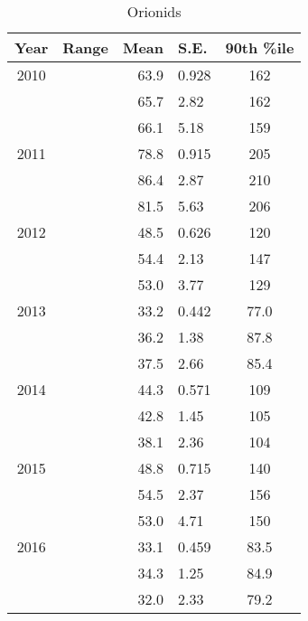 \begin{table}[h!]
	\centering
	\begin{tabular}{|c|c|r@{ \,$\pm$\, }l|c|}
		\hline 
		Year & Range & Mean & S.E. & 90th \%ile\\ 
		\hline 
		2010 & & 63.9 & 0.928 & 162   \\ 
		\hline 
		& &	65.7 & 2.82 & 162   \\ 
		\hline 
		& & 66.1 & 5.18 & 159   \\ 
		\hline 
		2011 & & 78.8 & 0.915 & 205   \\ 
		\hline 
		& & 86.4 & 2.87 & 210   \\ 
		\hline 
		& & 81.5 & 5.63 & 206   \\ 
		\hline 
		2012 & & 48.5 & 0.626 & 120   \\ 
		\hline 
		& & 54.4 & 2.13 & 147   \\ 
		\hline 
		& & 53.0 & 3.77 & 129   \\ 
		\hline 
		2013 & & 33.2 & 0.442 & 77.0   \\ 
		\hline 
		& & 36.2 & 1.38 & 87.8   \\ 
		\hline 
		& & 37.5 & 2.66 & 85.4   \\ 
		\hline 
		2014 & & 44.3 & 0.571 & 109   \\ 
		\hline 
		& & 42.8 & 1.45 & 105   \\ 
		\hline 
		& & 38.1 & 2.36 & 104  \\ 
		\hline 
		2015 & & 48.8 & 0.715 & 140   \\ 
		\hline 
		& & 54.5 & 2.37 & 156   \\ 
		\hline 
		& & 53.0 & 4.71 & 150   \\ 
		\hline
		2016 & & 33.1 & 0.459 & 83.5	\\
		\hline 
		& & 34.3 & 1.25 & 84.9   \\ 
		\hline 
		& & 32.0 & 2.33 & 79.2   \\ 
		\hline 
	\end{tabular}
	\caption{Orionids} 
\end{table}


